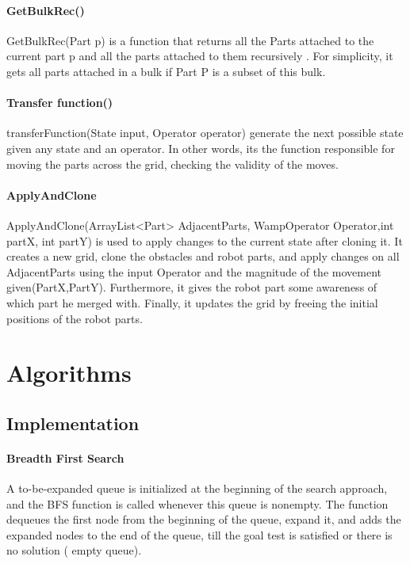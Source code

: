 \subsubsection{GetBulkRec()}
GetBulkRec(Part p) is a function that returns all the Parts attached to the current part p and all the parts attached to them recursively . For simplicity, it gets all parts attached in a bulk if Part P is a subset of this bulk. 



\subsubsection{Transfer function()}
transferFunction(State input, Operator operator) generate the next possible state given any state and an operator. In other words, its the function responsible for moving the parts across the grid, checking the validity of the moves. 

\subsubsection{ApplyAndClone}
ApplyAndClone(ArrayList<Part> AdjacentParts, WampOperator Operator,int partX, int partY) is used to apply changes to the current state after cloning it. It creates a new grid, clone the obstacles and robot parts, and apply changes on all AdjacentParts using the input Operator and the magnitude of the movement given(PartX,PartY). Furthermore, it gives the robot part some awareness of which part he merged with. Finally, it updates the grid by freeing the initial positions of the robot parts.

\chapter{Algorithms}
\section{Implementation}
\subsubsection{Breadth First Search}

A to-be-expanded queue is initialized at the beginning of the search approach, and the BFS function is called whenever this queue is nonempty. The function dequeues the first node from the beginning of the queue, expand it, and adds the expanded nodes to the end of the queue, till the goal test is satisfied or there is no solution ( empty queue).


